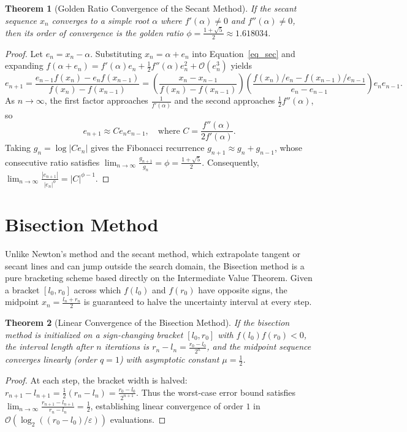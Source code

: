 \documentclass{amsart}
\newtheorem{theorem}{Theorem}
\begin{document}
\begin{theorem}[Golden Ratio Convergence of the Secant Method]
    If the secant sequence $x_n$ converges to a simple root $\alpha$ where $f'(\alpha) \neq 0$ and $f''(\alpha) \neq 0$, then its order of convergence is the golden ratio $\phi = \frac{1+\sqrt{5}}{2} \approx 1.618034$.
\end{theorem}
\begin{proof}
    Let $e_n = x_n - \alpha$. Substituting $x_n = \alpha + e_n$ into Equation~\eqref{eq_sec} and expanding $f(\alpha + e_n) = f'(\alpha)e_n + \frac{1}{2}f''(\alpha)e_n^2 + \mathcal{O}(e_n^3)$ yields
    \[
        e_{n+1} = \frac{e_{n-1}f(x_n) - e_n f(x_{n-1})}{f(x_n) - f(x_{n-1})}
        = \left(\frac{x_n - x_{n-1}}{f(x_n) - f(x_{n-1})}\right)\left(\frac{f(x_n)/e_n - f(x_{n-1})/e_{n-1}}{e_n - e_{n-1}}\right) e_n e_{n-1}.
    \]
    As $n \to \infty$, the first factor approaches $\frac{1}{f'(\alpha)}$ and the second approaches $\frac{1}{2}f''(\alpha)$, so
    \[
        e_{n+1} \approx C e_n e_{n-1}, \quad \text{where } C = \frac{f''(\alpha)}{2f'(\alpha)}.
    \]
    Taking $g_n = \log|C e_n|$ gives the Fibonacci recurrence $g_{n+1} \approx g_n + g_{n-1}$, whose consecutive ratio satisfies $\lim_{n\to\infty} \frac{g_{n+1}}{g_n} = \phi = \frac{1+\sqrt{5}}{2}$. Consequently, $\lim_{n\to\infty} \frac{|e_{n+1}|}{|e_n|^\phi} = |C|^{\phi - 1}$.
\end{proof}

\section{Bisection Method}\label{sec_bis}

Unlike Newton's method and the secant method, which extrapolate tangent or secant lines and can jump outside the search domain, the Bisection method is a pure bracketing scheme based directly on the Intermediate Value Theorem. Given a bracket $[l_0, r_0]$ across which $f(l_0)$ and $f(r_0)$ have opposite signs, the midpoint $x_n = \frac{l_n + r_n}{2}$ is guaranteed to halve the uncertainty interval at every step.

\begin{theorem}[Linear Convergence of the Bisection Method]
    If the bisection method is initialized on a sign-changing bracket $[l_0, r_0]$ with $f(l_0)f(r_0) < 0$, the interval length after $n$ iterations is $r_n - l_n = \frac{r_0 - l_0}{2^n}$, and the midpoint sequence converges linearly (order $q = 1$) with asymptotic constant $\mu = \frac{1}{2}$.
\end{theorem}
\begin{proof}
    At each step, the bracket width is halved: $r_{n+1} - l_{n+1} = \frac{1}{2}(r_n - l_n) = \frac{r_0 - l_0}{2^{n+1}}$. Thus the worst-case error bound satisfies $\lim_{n\to\infty} \frac{r_{n+1} - l_{n+1}}{r_n - l_n} = \frac{1}{2}$, establishing linear convergence of order $1$ in $\mathcal{O}(\log_2((r_0 - l_0)/\varepsilon))$ evaluations.
\end{proof}
\end{document}
